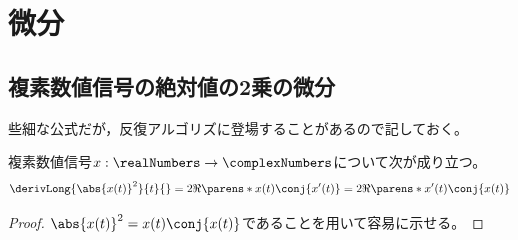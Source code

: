 \part{微分}
    \chapter{複素数値信号の絶対値の2乗の微分}
        些細な公式だが，反復アルゴリズに登場することがあるので記しておく。
        \begin{shadebox}
            複素数値信号$x:\realNumbers\to\complexNumbers$について次が成り立つ。
            \[ \derivLong{\abs{x(t)}^2}{t}{} = 2\Re\parens*{x(t)\conj{x'(t)}} = 2\Re\parens*{x'(t)\conj{x(t)}} \]
        \end{shadebox}
        \begin{proof}
            $\abs{x(t)}^2 = x(t)\conj{x(t)}$であることを用いて容易に示せる。
        \end{proof}

